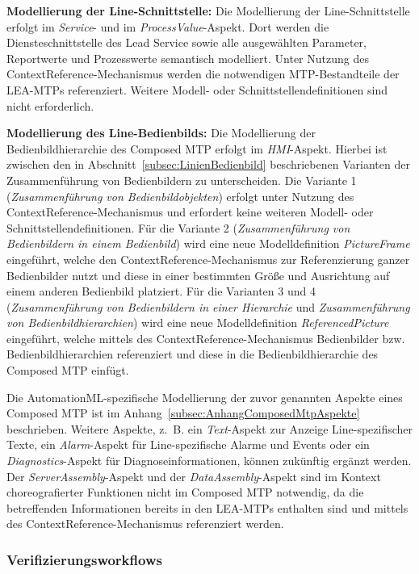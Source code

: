\textbf{Modellierung der Line-Schnittstelle:} Die Modellierung der Line-Schnittstelle erfolgt im \emph{Service}- und im \emph{ProcessValue}-Aspekt. Dort werden die Diensteschnittstelle des Lead Service sowie alle ausgewählten Parameter, Reportwerte und Prozesswerte semantisch modelliert. Unter Nutzung des ContextReference-Mechanismus werden die notwendigen MTP-Bestandteile der LEA-MTPs referenziert. Weitere Modell- oder Schnittstellendefinitionen sind nicht erforderlich. 

\textbf{Modellierung des Line-Bedienbilds:} Die Modellierung der Bedienbildhierarchie des Composed MTP erfolgt im \emph{HMI}-Aspekt. Hierbei ist zwischen den in Abschnitt~\ref{subsec:LinienBedienbild} beschriebenen Varianten der Zusammenführung von Bedienbildern zu unterscheiden. Die Variante 1 (\emph{Zusammenführung von Bedienbildobjekten}) erfolgt unter Nutzung des ContextReference-Mechanismus und erfordert keine weiteren Modell- oder Schnittstellendefinitionen. Für die Variante 2 (\emph{Zusammenführung von Bedienbildern in einem Bedienbild}) wird eine neue Modelldefinition \emph{PictureFrame} eingeführt, welche den ContextReference-Mechanismus zur Referenzierung ganzer Bedienbilder nutzt und diese in einer bestimmten Größe und Ausrichtung auf einem anderen Bedienbild platziert. Für die Varianten 3 und 4 (\emph{Zusammenführung von Bedienbildern in einer Hierarchie} und \emph{Zusammenführung von Bedienbildhierarchien}) wird eine neue Modelldefinition \emph{ReferencedPicture} eingeführt, welche mittels des ContextReference-Mechanismus Bedienbilder bzw. Bedienbildhierarchien referenziert und diese in die Bedienbildhierarchie des Composed MTP einfügt. 

Die AutomationML-spezifische Modellierung der zuvor genannten Aspekte eines Composed MTP ist im Anhang~\ref{subsec:AnhangComposedMtpAspekte} beschrieben. Weitere Aspekte, z.~B. ein \emph{Text}-Aspekt zur Anzeige Line-spezifischer Texte, ein \emph{Alarm}-Aspekt für Line-spezifische Alarme und Events oder ein \emph{Diagnostics}-Aspekt für Diagnoseinformationen, können zukünftig ergänzt werden. Der \emph{ServerAssembly}-Aspekt und der \emph{DataAssembly}-Aspekt sind im Kontext choreografierter Funktionen nicht im Composed MTP notwendig, da die betreffenden Informationen bereits in den LEA-MTPs enthalten sind und mittels des ContextReference-Mechanismus referenziert werden.

\subsubsection{Verifizierungsworkflows}

